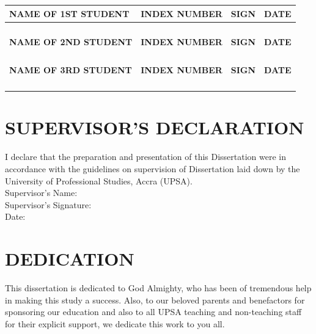 \documentclass[12pt,twoside]{report}
\begin{document}
\vspace{2cm}
\begin{tabular}{|p{5cm}|p{3cm}|p{2cm}|p{3cm}|}
\hline
\textbf{NAME OF 1ST STUDENT} & \textbf{INDEX NUMBER} & \textbf{SIGN} & \textbf{DATE} \\
\hline
& & & \\
& & & \\
& & & \\
& & & \\
\hline
\textbf{NAME OF 2ND STUDENT} & \textbf{INDEX NUMBER} & \textbf{SIGN} & \textbf{DATE} \\
\hline
& & & \\
& & & \\
& & & \\
& & & \\
\hline
\textbf{NAME OF 3RD STUDENT} & \textbf{INDEX NUMBER} & \textbf{SIGN} & \textbf{DATE} \\
\hline
& & & \\
& & & \\
& & & \\
& & & \\
\hline
\end{tabular}
\newpage

\chapter*{SUPERVISOR'S DECLARATION}
\vspace{3cm}
\noindent I declare that the preparation and presentation of this Dissertation were in accordance with the guidelines on supervision of Dissertation laid down by the University of Professional Studies, Accra (UPSA).\\

\vspace{2cm}
\noindent Supervisor's Name: \underline{\hspace{8cm}}\\

\vspace{1cm}
\noindent Supervisor's Signature: \underline{\hspace{10cm}}\\

\vspace{1cm}
\noindent Date: \underline{\hspace{10cm}}
\newpage

\chapter*{DEDICATION}
\vspace{3cm}
\begin{center}
This dissertation is dedicated to God Almighty, who has been of tremendous help in making this study a success. Also, to our beloved parents and benefactors for sponsoring our education and also to all UPSA teaching and non-teaching staff for their explicit support, we dedicate this work to you all.
\end{center}
\newpage
\end{document}

